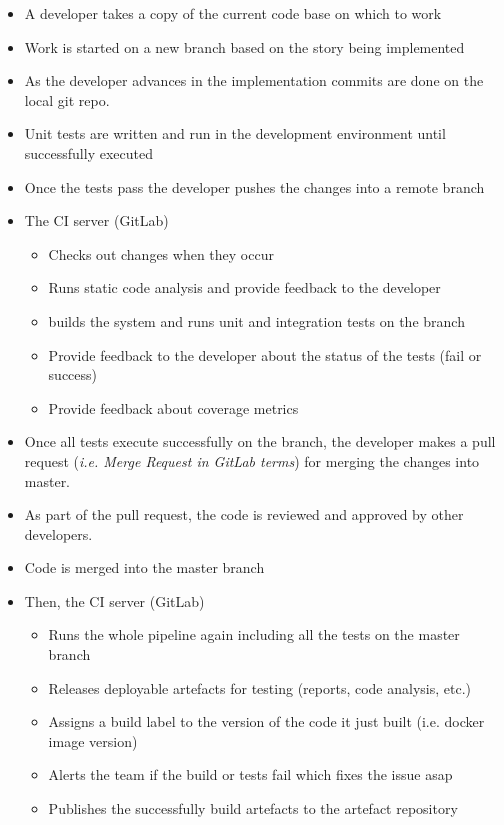 \documentclass[a4paper,
               keeplastbox,   %
               ]{jacow}
\begin{document}
\begin{itemize}
    \item A developer takes a copy of the current code base on which to work
    \item Work is started on a new branch based on the story being implemented
    \item As the developer advances in the implementation commits are done on the local git repo.
    \item Unit tests are written and run in the development environment until successfully executed
    \item Once the tests pass the developer pushes the changes into a remote branch
    \item The CI server (GitLab)
    \begin{itemize}
        \item Checks out changes when they occur
        \item Runs static code analysis and provide feedback to the developer
        \item builds the system and runs unit and integration tests on the branch
        \item Provide feedback to the developer about the status of the tests (fail or success)
        \item Provide feedback about coverage metrics
    \end{itemize}
    \item Once all tests execute successfully on the branch, the developer makes a pull request (\textit{i.e. Merge Request in GitLab terms}) for merging the changes into master.
    \item As part of the pull request, the code is reviewed and approved by other developers.
    \item Code is merged into the master branch
    \item Then, the CI server (GitLab)
    \begin{itemize}
        \item Runs the whole pipeline again including all the tests on the master branch
        \item Releases deployable artefacts for testing (reports, code analysis, etc.)
        \item Assigns a build label to the version of the code it just built (i.e. docker image version)
        \item Alerts the team if the build or tests fail which fixes the issue asap
        \item Publishes the successfully build artefacts to the artefact repository
    \end{itemize}
\end{itemize}
\end{document}
